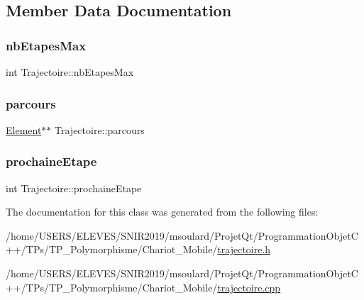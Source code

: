 \subsection{Member Data Documentation}
\mbox{\label{class_trajectoire_a62cc9d5c52215094c7f0731e07cccbf5}} 
\subsubsection{\texorpdfstring{nb\+Etapes\+Max}{nbEtapesMax}}
{\footnotesize\ttfamily int Trajectoire\+::nb\+Etapes\+Max\hspace{0.3cm}{\ttfamily [private]}}

\mbox{\label{class_trajectoire_a526de5df82ef3ae78757ecb441d4179e}} 
\subsubsection{\texorpdfstring{parcours}{parcours}}
{\footnotesize\ttfamily \hyperlink{class_element}{Element}$\ast$$\ast$ Trajectoire\+::parcours\hspace{0.3cm}{\ttfamily [private]}}

\mbox{\label{class_trajectoire_a56fb38e337100dcbc3c49727d8f68c6a}} 
\subsubsection{\texorpdfstring{prochaine\+Etape}{prochaineEtape}}
{\footnotesize\ttfamily int Trajectoire\+::prochaine\+Etape\hspace{0.3cm}{\ttfamily [private]}}



The documentation for this class was generated from the following files\+:\begin{DoxyCompactItemize}
\item 
/home/\+U\+S\+E\+R\+S/\+E\+L\+E\+V\+E\+S/\+S\+N\+I\+R2019/msoulard/\+Projet\+Qt/\+Programmation\+Objet\+C++/\+T\+Ps/\+T\+P\+\_\+\+Polymorphisme/\+Chariot\+\_\+\+Mobile/\hyperlink{trajectoire_8h}{trajectoire.\+h}\item 
/home/\+U\+S\+E\+R\+S/\+E\+L\+E\+V\+E\+S/\+S\+N\+I\+R2019/msoulard/\+Projet\+Qt/\+Programmation\+Objet\+C++/\+T\+Ps/\+T\+P\+\_\+\+Polymorphisme/\+Chariot\+\_\+\+Mobile/\hyperlink{trajectoire_8cpp}{trajectoire.\+cpp}\end{DoxyCompactItemize}
